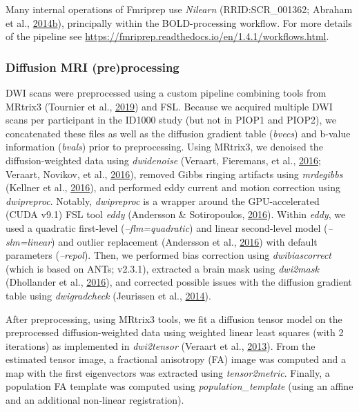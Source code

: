 \documentclass[11pt,american,a4paper,oneside,]{memoir} %
\begin{document}
Many internal operations of Fmriprep use \emph{Nilearn} (RRID:SCR\_001362; Abraham et al., \protect\hyperlink{ref-Abraham2014-ef}{2014}\protect\hyperlink{ref-Abraham2014-ef}{b}), principally within the BOLD-processing workflow. For more details of the pipeline see
\url{https://fmriprep.readthedocs.io/en/1.4.1/workflows.html}.

\hypertarget{diffusion-mri-preprocessing}{%
\subsubsection{Diffusion MRI (pre)processing}\label{diffusion-mri-preprocessing}}

DWI scans were preprocessed using a custom pipeline combining tools from MRtrix3 (Tournier et al., \protect\hyperlink{ref-Tournier2019-hh}{2019}) and FSL. Because we acquired multiple DWI scans per participant in the ID1000 study (but not in PIOP1 and PIOP2), we concatenated these files as well as the diffusion gradient table (\emph{bvecs}) and b-value information (\emph{bvals}) prior to preprocessing. Using MRtrix3, we denoised the diffusion-weighted data using \emph{dwidenoise} (Veraart, Fieremans, et al., \protect\hyperlink{ref-Veraart2016-zi}{2016}; Veraart, Novikov, et al., \protect\hyperlink{ref-Veraart2016-rv}{2016}), removed Gibbs ringing artifacts using \emph{mrdegibbs} (Kellner et al., \protect\hyperlink{ref-Kellner2016-xb}{2016}), and performed eddy current and motion correction using \emph{dwipreproc}. Notably, \emph{dwipreproc} is a wrapper around the GPU-accelerated (CUDA v9.1) FSL tool \emph{eddy} (Andersson \& Sotiropoulos, \protect\hyperlink{ref-Andersson2016-pg}{2016}). Within \emph{eddy}, we used a quadratic first-level (\emph{--flm=quadratic}) and linear second-level model (\emph{--slm=linear}) and outlier replacement (Andersson et al., \protect\hyperlink{ref-Andersson2016-nm}{2016}) with default parameters (\emph{--repol}). Then, we performed bias correction using \emph{dwibiascorrect} (which is based on ANTs; v2.3.1), extracted a brain mask using \emph{dwi2mask} (Dhollander et al., \protect\hyperlink{ref-Dhollander2016-dx}{2016}), and corrected possible issues with the diffusion gradient table using \emph{dwigradcheck} (Jeurissen et al., \protect\hyperlink{ref-Jeurissen2014-cd}{2014}).

After preprocessing, using MRtrix3 tools, we fit a diffusion tensor model on the preprocessed diffusion-weighted data using weighted linear least squares (with 2 iterations) as implemented in \emph{dwi2tensor} (Veraart et al., \protect\hyperlink{ref-Veraart2013-ya}{2013}). From the estimated tensor image, a fractional anisotropy (FA) image was computed and a map with the first eigenvectors was extracted using \emph{tensor2metric}. Finally, a population FA template was computed using \emph{population\_template} (using an affine and an additional non-linear registration).
\end{document}

